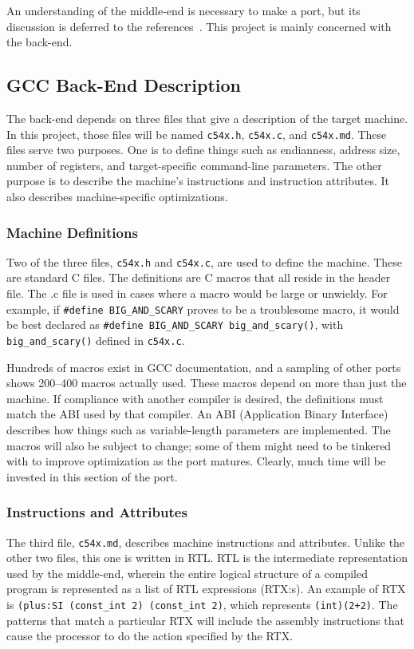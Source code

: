 \documentclass{article}
\newcommand{\file}[1]{{\tt#1}}
\begin{document}
An understanding of the middle-end is necessary to make a port, but its
discussion is deferred to the references~\cite{gccint}. This project is mainly concerned with
the back-end. 

\subsection{GCC Back-End Description}
The back-end depends on three files that give a description of the target
machine. In this project, those files will be named \file{c54x.h},
\file{c54x.c}, and \file{c54x.md}. These files serve two purposes. One is to
define things such as endianness, address size, number of registers, and
target-specific command-line parameters. The other purpose is to describe the
machine's instructions and instruction attributes. It also describes
machine-specific optimizations.

\subsubsection{Machine Definitions}
Two of the three files, \file{c54x.h} and \file{c54x.c}, are used to define the
machine. These are standard C files. The definitions are C macros that all
reside in the header file. The .c file is used in cases where a macro would be
large or unwieldy. For example, if \verb+#define BIG_AND_SCARY+ proves to be a
troublesome macro, it would be best declared as 
\verb+#define BIG_AND_SCARY big_and_scary()+, with 
\verb+big_and_scary()+ defined in \file{c54x.c}. 

Hundreds of macros exist in GCC documentation, and a sampling of other ports
shows 200--400 macros actually used. These macros depend on more than just the
machine. If compliance with another compiler is desired, the definitions must
match the ABI used by that compiler. An ABI (Application Binary Interface)
describes how things such as variable-length parameters are implemented. The
macros will also be subject to change; some of them might need to be tinkered
with to improve optimization as the port matures. Clearly, much time will be
invested in this section of the port.

\subsubsection{Instructions and Attributes} The third file, \file{c54x.md},
describes machine instructions and attributes. Unlike the other two files, this
one is written in RTL. RTL is the intermediate representation used by the
middle-end, wherein the entire logical structure of a compiled program is
represented as a list of RTL expressions (RTX:s). An example of RTX is
\verb+(plus:SI (const_int 2) (const_int 2)+, which represents \verb-(int)(2+2)-.
The patterns that match a particular RTX will include the assembly instructions
that cause the processor to do the action specified by the RTX. 
\end{document}
